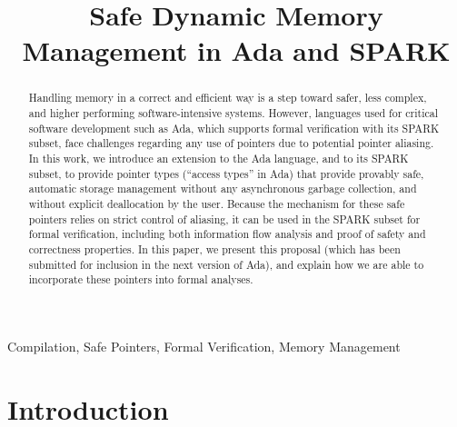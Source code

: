 \documentclass{llncs}
\begin{document}

\title{Safe Dynamic Memory Management in Ada and SPARK}

\maketitle
\begin{abstract}
Handling memory in a correct and efficient way is a step toward safer, less complex, and higher performing software-intensive systems. However, languages used for critical software development such as Ada, which supports formal verification with its SPARK subset, face challenges regarding any use of pointers due to potential pointer aliasing. In this work, we introduce an extension to the Ada language, and to its SPARK subset, to provide pointer types (``access types'' in Ada) that provide provably safe, automatic storage management without any asynchronous garbage collection, and without explicit deallocation by the user. Because the mechanism for these safe pointers relies on strict control of aliasing, it can be used in the SPARK subset for formal verification, including both information flow analysis and proof of safety and correctness properties. In this paper, we present this proposal (which has been submitted for inclusion in the next version of Ada), and explain
how we are able to incorporate these pointers into formal analyses.
\end{abstract}



\keywords

Compilation, Safe Pointers, Formal Verification, Memory Management


\section{Introduction}
\end{document}
